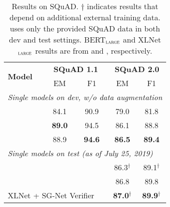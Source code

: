 \begin{table}[t]
\begin{center}
\begin{tabular}{lcccc}
\toprule
\multirow{2}{*}{\bf Model} & \multicolumn{2}{c}{\bf SQuAD 1.1} &\multicolumn{2}{c}{\bf SQuAD 2.0} \\
&  EM &  F1 &  EM &  F1  \\
\midrule
\multicolumn{5}{l}{\textit{Single models on dev, w/o data augmentation}}\\
\bertlarge{} &  84.1&90.9&79.0&81.8\\
\xlnetlarge{} &\bf{89.0}& 94.5&86.1&88.8\\
\ourmodel{} & 88.9 & \bf{94.6} & \bf{86.5} &\bf{89.4}\\
\midrule
\multicolumn{5}{l}{\textit{Single models on test (as of July 25, 2019)}}\\
\multicolumn{3}{l}{\xlnetlarge{}} & 86.3$^{\dag}$ & 89.1$^{\dag}$ \\
\multicolumn{3}{l}{\ourmodel{}} & 86.8 & 89.8 \\
\multicolumn{3}{l}{XLNet + SG-Net Verifier} & \textbf{87.0}$^{\dag}$ & \textbf{89.9}$^{\dag}$ \\
\bottomrule
\end{tabular}
\end{center}
\caption{
Results on SQuAD.
$\dag$ indicates results that depend on additional external training data.
\ourmodel{} uses only the provided SQuAD data in both dev and test settings.
BERT$_{\textsc{large}}$ and XLNet$_{\textsc{large}}$ results are from  and , respectively.
}
\label{tab:roberta_squad}
\end{table}